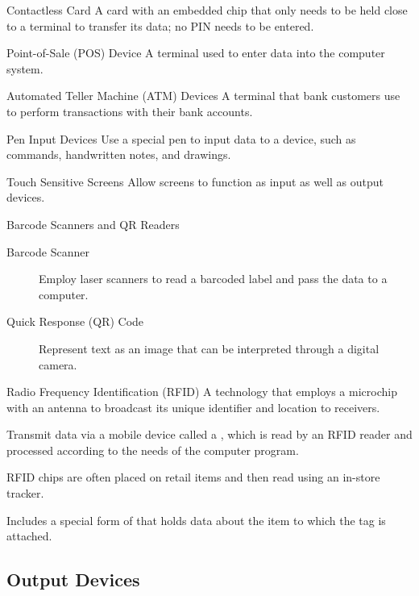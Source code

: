 \documentclass[\main/notes.tex]{subfiles}
\begin{document}
				\begin{definition}{Contactless Card}
					A card with an embedded chip that only needs to be held close to a terminal to transfer its data; no PIN needs to be entered. 
				\end{definition}
				\begin{definition}{Point-of-Sale (POS) Device}
					A terminal used to enter data into the computer system.
				\end{definition}
				\begin{definition}{Automated Teller Machine (ATM) Devices}
					A terminal that bank customers use to perform transactions with their bank accounts.
				\end{definition}
				\begin{definition}{Pen Input Devices}
					Use a special pen to input data to a device, such as commands, handwritten notes, and drawings.
				\end{definition}
				\begin{definition}{Touch Sensitive Screens}
					Allow screens to function as input as well as output devices.
				\end{definition}
				\begin{definition}{Barcode Scanners and QR Readers}
					\begin{description}
						\item[Barcode Scanner] Employ laser scanners to read a barcoded label and pass the data to a computer.
						\item[Quick Response (QR) Code] Represent text as an image that can be interpreted through a digital camera.
					\end{description}
				\end{definition}
				\begin{definition}{Radio Frequency Identification (RFID)}
					A technology that employs a microchip with an antenna to broadcast its unique identifier and location to receivers.

					Transmit data via a mobile device called a , which is read by an RFID reader and processed according to the needs of the computer program.

					RFID chips are often placed on retail items and then read using an in-store tracker.

					Includes a special form of  that holds data about the item to which the tag is attached.
				\end{definition}
			\subsection{Output Devices}
\end{document}
